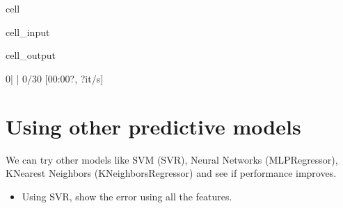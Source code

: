 \documentclass[letterpaper,10pt,english]{jupyterBook}
\begin{document}
\begin{sphinxuseclass}{cell}
\begin{sphinxVerbatimInput}
\begin{sphinxuseclass}{cell_input}
\end{sphinxuseclass}\end{sphinxVerbatimInput}
\begin{sphinxVerbatimOutput}

\begin{sphinxuseclass}{cell_output}
\begin{sphinxVerbatim}[commandchars=\\\{\}]
  0\PYGZpc{}|          | 0/30 [00:00\PYGZlt{}?, ?it/s]
\end{sphinxVerbatim}

\noindent{}

\end{sphinxuseclass}\end{sphinxVerbatimOutput}

\end{sphinxuseclass}

\section{Using other predictive models}
\label{\detokenize{05:using-other-predictive-models}}
\sphinxAtStartPar
We can try other models like SVM (SVR), Neural Networks (MLPRegressor), K\sphinxhyphen{}Nearest Neighbors (KNeighborsRegressor) and see if performance improves.
\begin{itemize}
\item {} 
\sphinxAtStartPar
Using SVR, show the error using all the features.

\end{itemize}
\end{document}
